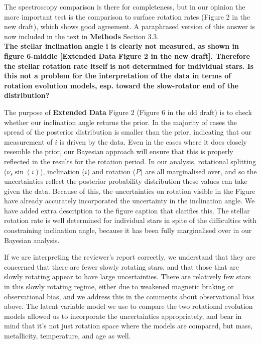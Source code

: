 \documentclass[11pt]{article}
\begin{document}
The spectroscopy comparison is there for completeness, but in our opinion the more important test is the comparison to surface rotation rates (Figure 2 in the new draft), which shows good agreement. A paraphrased version of this answer is now included in the text in \textbf{Methods} Section 3.3.\\

\noindent \textbf{The stellar inclination angle i is clearly not measured, as shown in figure 6-middle [\textbf{Extended Data} Figure 2 in the new draft]. Therefore the stellar rotation rate itself is not determined for individual stars. Is this not a problem for the interpretation of the data in terms of rotation evolution models, esp. toward the slow-rotator end of the distribution?}

The purpose of \textbf{Extended Data} Figure 2 (Figure 6 in the old draft) is to check whether our inclination angle returns the prior. In the majority of cases the spread of the posterior distribution is smaller than the prior, indicating that our measurement of $i$ is driven by the data. Even in the cases where it does closely resemble the prior, our Bayesian approach will ensure that this is properly reflected in the results for the rotation period. In our analysis, rotational splitting ($\nu_{s}\sin(i)$), inclination ($i$) and rotation ($P$) are all marginalised over, and so the uncertainties reflect the posterior probability distribution these values can take given the data. Because of this, the uncertainties on rotation visible in the Figure have already accurately incorporated the uncertainty in the inclination angle. We have added extra description to the figure caption that clarifies this. The stellar rotation rate is well determined for individual stars in spite of the difficulties with constraining inclination angle, because it has been fully marginalised over in our Bayesian analysis.

If we are interpreting the reviewer’s report correctly, we understand that they are concerned that there are fewer slowly rotating stars, and that those that are slowly rotating appear to have large uncertainties. There are relatively few stars in this slowly rotating regime, either due to weakened magnetic braking or observational bias, and we address this in the comments about observational bias above. The latent variable model we use to compare the two rotational evolution models allowed us to incorporate the uncertainties appropriately, and bear in mind that it’s not just rotation space where the models are compared, but mass, metallicity, temperature, and age as well.\\
\end{document}
